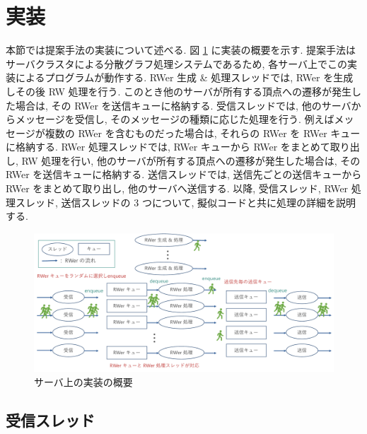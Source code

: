 \section{実装}\label{実装}

本節では提案手法の実装について述べる. 図 \ref{サーバ上の実装の概要} に実装の概要を示す. 提案手法はサーバクラスタによる分散グラフ処理システムであるため, 各サーバ上でこの実装によるプログラムが動作する. RWer 生成 \& 処理スレッドでは, RWer を生成しその後 RW 処理を行う. このとき他のサーバが所有する頂点への遷移が発生した場合は, その RWer を送信キューに格納する. 受信スレッドでは, 他のサーバからメッセージを受信し, そのメッセージの種類に応じた処理を行う. 例えばメッセージが複数の RWer を含むものだった場合は, それらの RWer を RWer キューに格納する. RWer 処理スレッドでは, RWer キューから RWer をまとめて取り出し, RW 処理を行い, 他のサーバが所有する頂点への遷移が発生した場合は, その RWer を送信キューに格納する. 送信スレッドでは, 送信先ごとの送信キューから RWer をまとめて取り出し, 他のサーバへ送信する. 以降, 受信スレッド, RWer 処理スレッド, 送信スレッドの 3 つについて, 擬似コードと共に処理の詳細を説明する. 

\begin{figure}[t]
    \centering
    \includegraphics[scale=0.5]{figure/implementation.pdf}
    \caption{サーバ上の実装の概要}
    \label{サーバ上の実装の概要}
\end{figure}

\subsection{受信スレッド}

